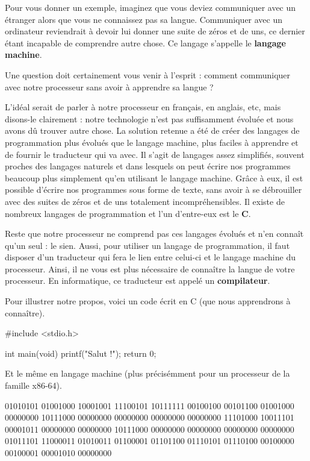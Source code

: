 Pour vous donner un exemple, imaginez que vous deviez communiquer avec
un étranger alors que vous ne connaissez pas sa langue. Communiquer
avec un ordinateur reviendrait à devoir lui donner une suite de zéros
et de uns, ce dernier étant incapable de comprendre autre chose. Ce
langage s'appelle le \textbf{langage machine}.

Une question doit certainement vous venir à l'esprit : comment
communiquer avec notre processeur sans avoir à apprendre sa langue ?

L'idéal serait de parler à notre processeur en français, en anglais,
etc, mais disons-le clairement : notre technologie n'est pas
suffisamment évoluée et nous avons dû trouver autre chose. La solution
retenue a été de créer des langages de programmation plus évolués que
le langage machine, plus faciles à apprendre et de fournir le
traducteur qui va avec. Il s'agit de langages assez simplifiés,
souvent proches des langages naturels et dans lesquels on peut écrire
nos programmes beaucoup plus simplement qu'en utilisant le langage
machine. Grâce à eux, il est possible d'écrire nos programmes sous
forme de texte, sans avoir à se débrouiller avec des suites de zéros
et de uns totalement incompréhensibles. Il existe de nombreux langages
de programmation et l'un d'entre-eux est le \textbf{C}.

Reste que notre processeur ne comprend pas ces langages évolués et
n'en connaît qu'un seul : le sien. Aussi, pour utiliser un langage de
programmation, il faut disposer d'un traducteur qui fera le lien entre
celui-ci et le langage machine du processeur. Ainsi, il ne vous est
plus nécessaire de connaître la langue de votre processeur. En
informatique, ce traducteur est appelé un \textbf{compilateur}.

Pour illustrer notre propos, voici un code écrit en C (que nous
apprendrons à connaître).

\begin{C}
  #include <stdio.h>

  int main(void) { printf("Salut !\n"); return 0; }
\end{C}

\clearpage

Et le même en langage machine (plus précisémment pour un processeur de
la famille x86-64).

\begin{C}
  01010101 01001000 10001001 11100101 10111111 00100100 00101100
  01001000 00000000 10111000 00000000 00000000 00000000 00000000
  11101000 10011101 00001011 00000000 00000000 10111000 00000000
  00000000 00000000 00000000 01011101 11000011 01010011 01100001
  01101100 01110101 01110100 00100000 00100001 00001010 00000000
\end{C}

